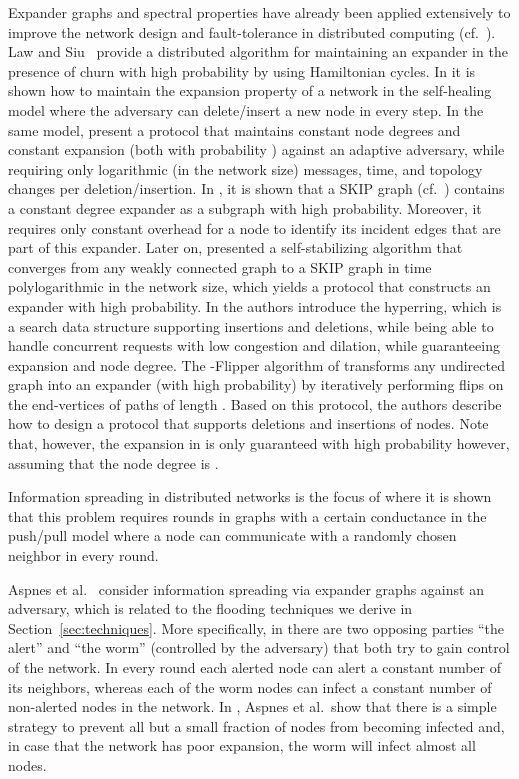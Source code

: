 \documentclass[leqno,11pt]{article}
\begin{document}
Expander graphs and spectral properties have already been applied
extensively to improve the network design and fault-tolerance in
distributed computing (cf.\ \cite{Upfal94,DPPU88,BBCES2006}).
Law and Siu\ \cite{LS03} provide a distributed algorithm for maintaining an expander in
the presence of churn with high probability by using Hamiltonian cycles.
In \cite{PT11} it is shown how to maintain the expansion property of a network
in the self-healing model where the adversary can delete/insert a new node in
every step.
In the same model, \cite{IPDPS14} present a protocol that maintains constant node degrees and constant expansion (both with probability ) against an adaptive adversary, while requiring only logarithmic (in the network size) messages, time, and topology changes per deletion/insertion.
In \cite{skipexp}, it is shown that a SKIP graph (cf.\ \cite{skip}) contains a constant degree expander as a subgraph with high probability.
Moreover, it requires only constant overhead for a node to identify its incident edges that are part of this expander.
Later on, \cite{skipplus} presented a self-stabilizing algorithm that converges from any weakly connected graph to a SKIP graph in time polylogarithmic in the network size, which yields a protocol that constructs an expander with high probability.
In  \cite{hyperring} the authors introduce the hyperring, which is a search data structure supporting insertions and deletions, while being able to handle concurrent requests with low congestion and dilation, while guaranteeing  expansion and  node degree.
The -Flipper algorithm of \cite{mahlmann} transforms any undirected graph into an expander (with high probability) by iteratively performing flips on the end-vertices of paths of length .
Based on this protocol, the authors describe how to design a protocol that supports deletions and insertions of nodes.
Note that, however, the expansion in \cite{mahlmann} is only guaranteed with high probability however, assuming that the node degree is .

Information spreading in distributed networks is the focus of
\cite{CH:PODC10} where it is shown that this problem requires 
rounds in graphs with a certain conductance in the push/pull model 
where a node can communicate with a
randomly chosen neighbor in every round. 

Aspnes et al.\ \cite{ARS07} consider information spreading via expander
graphs against an adversary, which is related to the flooding
techniques we derive in Section~\ref{sec:techniques}. More specifically,
in \cite{ARS07} there are two opposing parties ``the alert'' and ``the
worm'' (controlled by the adversary) that both try to gain control of the
network. In every round each alerted node can alert a constant number of
its neighbors, whereas each of the worm nodes can infect a constant
number of non-alerted nodes in the network. In \cite{ARS07}, Aspnes et al.\ show that there is a simple strategy to prevent all
but a small fraction of nodes from becoming infected and, in case that the
network has poor expansion, the worm will infect almost all nodes.
\end{document}

